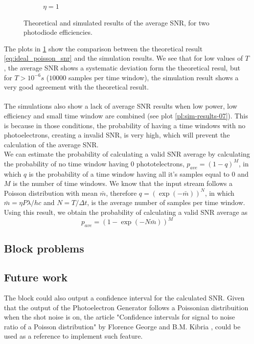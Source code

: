 \begin{refsection}
\begin{figure}[H]
\begin{subfigure}{0.45\textwidth}
		\caption{$\eta = 1$}
	\end{subfigure}
	\caption{Theoretical and simulated results of the average SNR, for two photodiode efficiencies.}
	\label{pl:sim-results}
\end{figure}
%
The plots in \ref{pl:sim-results} show the comparison between the theoretical result \ref{eq:ideal_poisson_snr} and the simulation results.
We see that for low values of $T$, the average SNR shows a systematic deviation form the theoretical resul, but for $T > 10^{-6}s$ ($10000$ samples per time window), the simulation result shows a very good agreement with the theoretical result.\\
\\
The simulations also show a lack of average SNR results when low power, low efficiency and small time window are combined (see plot \ref{pl:sim-results-07}). This is because in those conditions, the probability of having a time windows with no photoelectrons, creating a invalid SNR, is very high, which will prevent the calculation of the average SNR.\\
We can estimate the probability of calculating a valid SNR average by calculating the probability of no time window having $0$ phototelectrons, $p_{ave} = (1-q)^M$, in which $q$ is the probability of a time window having all it's samples equal to $0$ and $M$ is the number of time windows.
We know that the input stream follows a Poisson distribution with mean $\bar{m}$, therefore $q = (\exp (- \bar{m}))^N$, in which $\bar{m} = \eta P \lambda /h c$ and $N = T/\Delta t$, is the average number of samples per time window.
Using this result, we obtain the probability of calculating a valid SNR average as
\begin{equation}
	p_{ave} = \left( 1 - \exp( - N \bar{m}) \right)^M
\end{equation}



\subsection*{Block problems}




\subsection*{Future work}

The block could also output a confidence interval for the calculated SNR.
Given that the output of the Photoelectron Generator follows a Poissonian distribuition when the shot noise is on, the article "Confidence intervals for signal to noise ratio of a Poisson distribution" by Florence George and B.M. Kibria \cite{george2011}, could be used as a reference to implement such feature.



\clearpage
\printbibliography[heading=subbibliography]
\end{refsection}
\cleardoublepage
